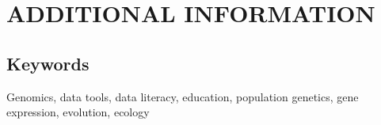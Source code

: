 \documentclass{cv}
\begin{document}
\section*{ADDITIONAL INFORMATION}

%

\subsection*{Keywords}

Genomics, data tools, data literacy, education, population genetics, gene expression, evolution, ecology
\end{document}
